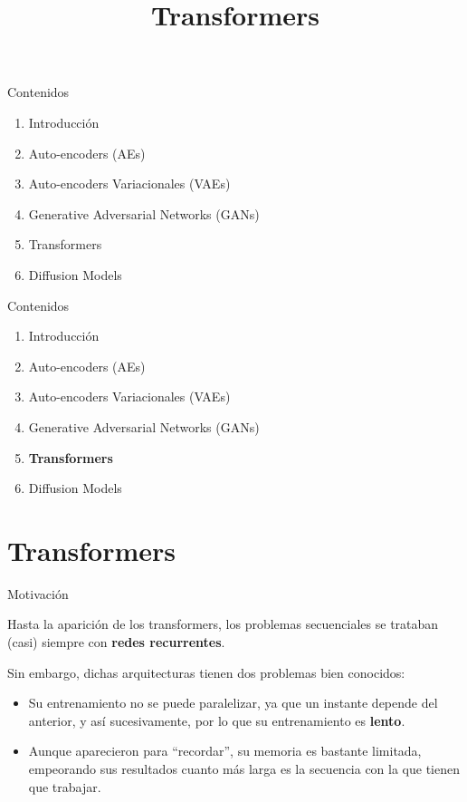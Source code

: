 



\title{Transformers}


\maketitle

\begin{frame}{Contenidos}
  \begin{enumerate}
      \item Introducción
      \item Auto-encoders (AEs)
      \item{Auto-encoders Variacionales (VAEs)}
      \item{Generative Adversarial Networks (GANs)}
      \item{Transformers}
      \item{Diffusion Models}
    \end{enumerate}
\end{frame}


\begin{frame}{Contenidos}
  \begin{enumerate}
      \item Introducción
      \item Auto-encoders (AEs)
      \item{Auto-encoders Variacionales (VAEs)}
      \item{Generative Adversarial Networks (GANs)}
      \item{\textbf{Transformers}}
      \item{Diffusion Models}
    \end{enumerate}
\end{frame}

\section{Transformers}


\begin{frame}{Motivación}

Hasta la aparición de los transformers, los problemas secuenciales se trataban (casi) siempre con \textbf{redes recurrentes}.

Sin embargo, dichas arquitecturas tienen dos problemas bien conocidos:

\begin{itemize}
    \item Su entrenamiento no se puede paralelizar, ya que un instante depende del anterior, y así sucesivamente, por lo que su entrenamiento es \textbf{lento}.
    \item Aunque aparecieron para ``recordar'', su memoria es bastante limitada, empeorando sus resultados cuanto más larga es la secuencia con la que tienen que trabajar.
\end{itemize}
\end{frame}

